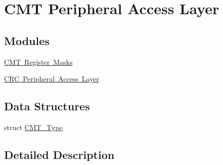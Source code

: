 \hypertarget{group___c_m_t___peripheral___access___layer}{}\section{C\+MT Peripheral Access Layer}
\label{group___c_m_t___peripheral___access___layer}
\subsection*{Modules}
\begin{DoxyCompactItemize}
\item 
\mbox{\hyperlink{group___c_m_t___register___masks}{C\+M\+T Register Masks}}
\item 
\mbox{\hyperlink{group___c_r_c___peripheral___access___layer}{C\+R\+C Peripheral Access Layer}}
\end{DoxyCompactItemize}
\subsection*{Data Structures}
\begin{DoxyCompactItemize}
\item 
struct \mbox{\hyperlink{struct_c_m_t___type}{C\+M\+T\+\_\+\+Type}}
\end{DoxyCompactItemize}


\subsection{Detailed Description}
